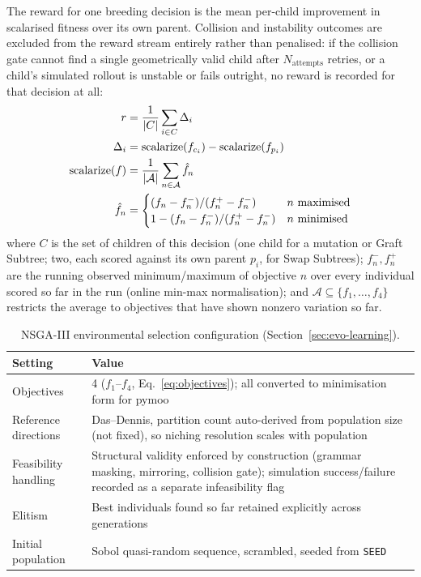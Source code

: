 \documentclass[12pt,a4paper]{report}
\begin{document}
The reward for one breeding decision is the mean per-child improvement in scalarised fitness over its own parent. Collision and instability outcomes are excluded from the reward stream entirely rather than penalised: if the collision gate cannot find a single geometrically valid child after $N_{\text{attempts}}$ retries, or a child's simulated rollout is unstable or fails outright, no reward is recorded for that decision at all:
\begin{align}
r &= \frac{1}{|C|}\sum_{i \in C} \Delta_i \label{eq:reward-appendix} \\
\Delta_i &= \mathrm{scalarize}(f_{c_i}) - \mathrm{scalarize}(f_{p_i}) \\
\mathrm{scalarize}(f) &= \frac{1}{|\mathcal{A}|}\sum_{n \in \mathcal{A}} \hat f_n \\
\hat f_n &=
\begin{cases}
(f_n - f_n^{-}) / (f_n^{+} - f_n^{-}) & n \text{ maximised} \\
1 - (f_n - f_n^{-}) / (f_n^{+} - f_n^{-}) & n \text{ minimised}
\end{cases} \notag
\end{align}
where $C$ is the set of children of this decision (one child for a mutation or Graft Subtree; two, each scored against its own parent $p_i$, for Swap Subtrees); $f_n^{-}, f_n^{+}$ are the running observed minimum/maximum of objective $n$ over every individual scored so far in the run (online min-max normalisation); and $\mathcal{A} \subseteq \{f_1,\ldots,f_4\}$ restricts the average to objectives that have shown nonzero variation so far.

\begin{table}[htbp]
\centering
\footnotesize
\caption{NSGA-III environmental selection configuration (Section~\ref{sec:evo-learning}).}
\label{tab:nsga3-appendix}
\begin{tabular}{@{}p{5.2cm}p{8.8cm}@{}}
\toprule
\textbf{Setting} & \textbf{Value} \\
\midrule
Objectives & 4 ($f_1$--$f_4$, Eq.~\ref{eq:objectives}); all converted to minimisation form for pymoo \\
Reference directions & Das--Dennis, partition count auto-derived from population size (not fixed), so niching resolution scales with population \\
Feasibility handling & Structural validity enforced by construction (grammar masking, mirroring, collision gate); simulation success/failure recorded as a separate infeasibility flag \\
Elitism & Best individuals found so far retained explicitly across generations \\
Initial population & Sobol quasi-random sequence, scrambled, seeded from \texttt{SEED} \\
\bottomrule
\end{tabular}
\end{table}
\end{document}
